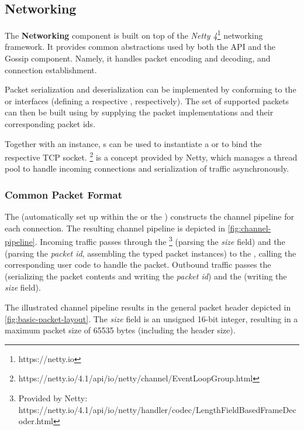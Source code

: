 \subsection{Networking}\label{subsec:networking}

The \textbf{Networking} component is built on top of the \textit{Netty 4}\footnote{https://netty.io} networking framework.
It provides common abstractions used by both the API and the Gossip component.
Namely, it handles packet encoding and decoding, and connection establishment.

Packet serialization and deserialization can be implemented by conforming to the  or
 interfaces (defining a respective , respectively).
The set of supported packets can then be built using  by supplying the packet
implementations and their corresponding packet ids.

Together with an  instance, s can be used to instantiate
a  or  to bind the respective TCP socket.
\footnote{https://netty.io/4.1/api/io/netty/channel/EventLoopGroup.html}
is a concept provided by Netty, which manages a thread pool to handle incoming connections and
serialization of traffic asynchronously.

\subsubsection{Common Packet Format}

The  (automatically set up within the  or the )
constructs the channel pipeline for each connection.
The resulting channel pipeline is depicted in \autoref{fig:channel-pipeline}.
Incoming traffic passes through the \footnote{Provided by Netty: https://netty.io/4.1/api/io/netty/handler/codec/LengthFieldBasedFrameDecoder.html}
(parsing the \textit{size} field) and the  (parsing the \textit{packet id}, assembling the typed packet instances)
to the , calling the corresponding user code to handle the packet.
Outbound traffic passes the  (serializing the packet contents and writing the \textit{packet id})
and the  (writing the \textit{size} field).

The illustrated channel pipeline results in the general packet header depicted in \autoref{fig:basic-packet-layout}.
The \textit{size} field is an unsigned 16-bit integer, resulting in a maximum packet size of
65535 bytes (including the header size).

